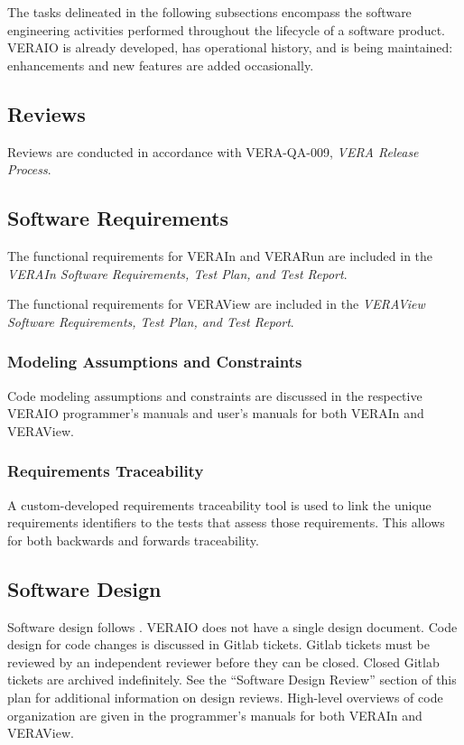 \documentclass{vera-ornltm}
\begin{document}
The tasks delineated in the following subsections encompass the software engineering activities performed throughout the lifecycle of a software product.
VERAIO is already developed, has operational history, and is being maintained: enhancements and new features are added occasionally.

\subsection{Reviews}

Reviews are conducted in accordance with VERA-QA-009, {\it VERA Release Process}.

\subsection{Software Requirements}

The functional requirements for VERAIn and VERARun are included in the
{\it VERAIn Software Requirements, Test Plan, and Test Report}.

The functional requirements for VERAView are included in the
{\it VERAView Software Requirements, Test Plan, and Test Report}.


\subsubsection{Modeling Assumptions and Constraints}

Code modeling assumptions and constraints are discussed in the respective VERAIO programmer's manuals and user's manuals for both VERAIn and VERAView.

\subsubsection{Requirements Traceability}

A custom-developed requirements traceability tool is used to link the unique requirements identifiers to the tests that assess those requirements. This allows for both backwards and forwards traceability.

\subsection{Software Design}

Software design follows \VERAReq.
VERAIO does not have a single design document.
Code design for code changes is discussed in Gitlab tickets.
Gitlab tickets must be reviewed by an independent reviewer before they can be closed.
Closed Gitlab tickets are archived indefinitely.
See the ``Software Design Review'' section of this plan for additional information on design reviews. High-level overviews of code organization are given in the programmer's manuals for both VERAIn and VERAView.
\end{document}
